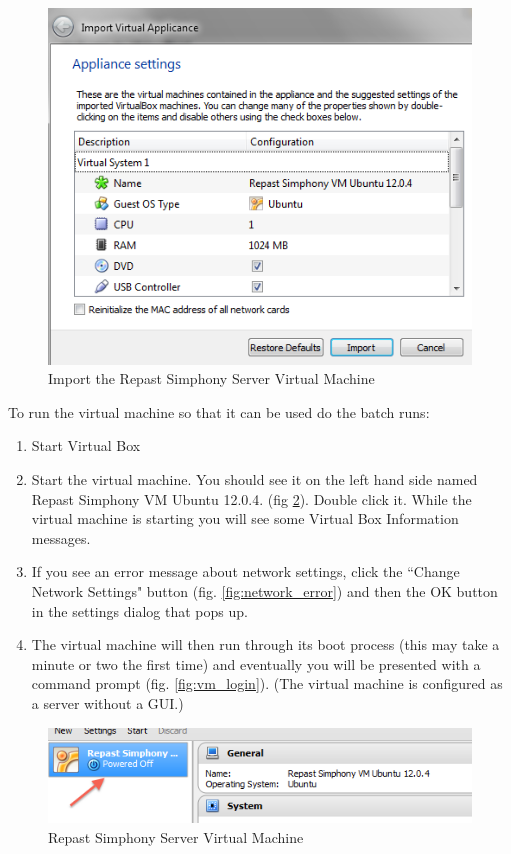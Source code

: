 \documentclass[11pt]{amsart}
\begin{document}
\begin{figure}[h]
\begin{center}
\vspace{.2in}
\centerline {
\includegraphics[width=4.5in]{images/import_vm.png}
}
\caption{Import the Repast Simphony Server Virtual Machine}
\label{fig:import_vm}
\end{center}
\end{figure}

\noindent
To run the virtual machine so that it can be used do the batch runs:

\begin{enumerate}
\item Start Virtual Box
\item Start the virtual machine. You should see it on the left hand side named Repast Simphony VM Ubuntu 12.0.4. (fig \ref{fig:vm}). Double click it. While the virtual machine is starting you will see some Virtual Box Information messages.
\item If you see an error message about network settings, click the ``Change Network Settings" button (fig. \ref{fig:network_error}) and then the OK button in the settings dialog that pops up.
\item The virtual machine will then run through its boot process (this may take a minute or two the first time) and eventually you will be presented with a command prompt (fig. \ref{fig:vm_login}). (The virtual machine is configured as a server without a GUI.)
\end{enumerate}

\begin{figure}[h]
\begin{center}
\vspace{.2in}
\centerline {
\includegraphics[width=4.5in]{images/vm.png}
}
\caption{Repast Simphony Server Virtual Machine}
\label{fig:vm}
\end{center}
\end{figure}
\end{document}
